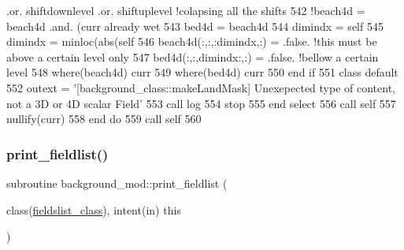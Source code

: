 \begin{DoxyCode}
      .or. shiftdownlevel .or. shiftuplevel \textcolor{comment}{!colapsing all the shifts                    }
542                     \textcolor{comment}{!beach4d = beach4d .and. (curr%
       already wet}
543                     bed4d = beach4d
544                     dimindx = self%
545                     dimindx = minloc(abs(self%
546                     beach4d(:,:,:dimindx,:) = .false. \textcolor{comment}{!this must be above a certain level only}
547                     bed4d(:,:,dimindx:,:) = .false.   \textcolor{comment}{!bellow a certain level}
548                     \textcolor{keywordflow}{where}(beach4d) curr%
549                     \textcolor{keywordflow}{where}(bed4d) curr%
550 \textcolor{keywordflow}{                end if}                
551 \textcolor{keywordflow}{                class default}
552                 outext = \textcolor{stringliteral}{'[background\_class::makeLandMask] Unexepected type of content, not a 3D or 4D
       scalar Field'}
553                 \textcolor{keyword}{call }log%
554                 stop
555 \textcolor{keywordflow}{            end select}       
556         \textcolor{keyword}{call }self%
557         \textcolor{keyword}{nullify}(curr)
558 \textcolor{keywordflow}{    end do}
559     \textcolor{keyword}{call }self%
560     
\end{DoxyCode}
\mbox{\label{namespacebackground__mod_acdcc52b4fb298bc145a121f9e8a4b929}} 
\subsubsection{\texorpdfstring{print\+\_\+fieldlist()}{print\_fieldlist()}}
{\footnotesize\ttfamily subroutine background\+\_\+mod\+::print\+\_\+fieldlist (\begin{DoxyParamCaption}\item[{class(\mbox{\hyperlink{structbackground__mod_1_1fieldslist__class}{fieldslist\+\_\+class}}), intent(in)}]{this }\end{DoxyParamCaption})\hspace{0.3cm}{\ttfamily [private]}}




